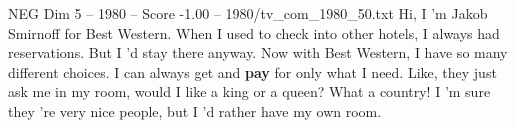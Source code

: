 \begin{textsample}{NEG Dim 5 – 1980 – Score -1.00 – 1980/tv\_com\_1980\_50.txt}  \label{ex:f5_neg_087}
Hi, I 'm Jakob Smirnoff for Best Western.
When I used to check into other hotels, I always had reservations.
But I 'd stay there anyway.
Now with Best Western, I have so many different choices.
I can always get and \textbf{pay} for only what I need.
Like, they just ask me in my room, would I like a king or a queen?
What a country!
I 'm sure they 're very nice people, but I 'd rather have my own room.

\end{textsample}
